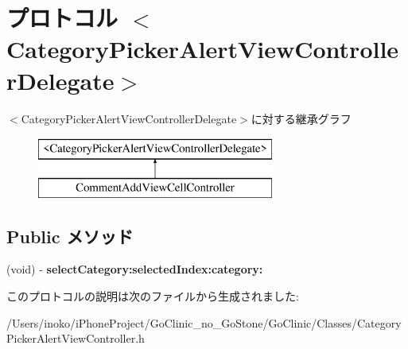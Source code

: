 \hypertarget{protocol_category_picker_alert_view_controller_delegate-p}{
\section{プロトコル $<$CategoryPickerAlertViewControllerDelegate$>$}
\label{protocol_category_picker_alert_view_controller_delegate-p}
}
$<$CategoryPickerAlertViewControllerDelegate$>$に対する継承グラフ\begin{figure}[H]
\begin{center}
\leavevmode
\includegraphics[height=2.000000cm]{protocol_category_picker_alert_view_controller_delegate-p}
\end{center}
\end{figure}
\subsection*{Public メソッド}
\begin{DoxyCompactItemize}
\item 
\hypertarget{protocol_category_picker_alert_view_controller_delegate-p_a5b7bc77bba175feee9be6aa41d44ab71}{
(void) -\/ {\bfseries selectCategory:selectedIndex:category:}}
\label{protocol_category_picker_alert_view_controller_delegate-p_a5b7bc77bba175feee9be6aa41d44ab71}

\end{DoxyCompactItemize}


このプロトコルの説明は次のファイルから生成されました:\begin{DoxyCompactItemize}
\item 
/Users/inoko/iPhoneProject/GoClinic\_\-no\_\-GoStone/GoClinic/Classes/CategoryPickerAlertViewController.h\end{DoxyCompactItemize}
